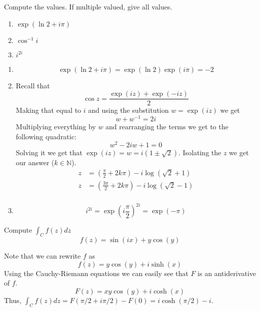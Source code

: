 \documentclass{article}
\def\N{\mathbb{N}}
\renewcommand{\exp}[1]{\operatorname{exp}\left(#1\right)}
\begin{document}
    \begin{tcolorbox}[title=Exercise 4]
        Compute the values. If multiple valued, give all values.
        \begin{enumerate}[label=(\alph*)]
            \item $\exp{\ln{2} + i\pi}$
            \item $\cos^{-1}{i}$
            \item $i^{2i}$
        \end{enumerate}
    \end{tcolorbox}
    \begin{enumerate}[label=(\alph*)]
        \item \begin{equation*}
            \exp{\ln{2} + i\pi} = \exp{\ln{2}}\exp{i\pi} = -2
        \end{equation*}
        \item Recall that
        \begin{equation*}
            \cos{z} = \frac{\exp{iz} + \exp{-iz}}{2}
        \end{equation*}
        Making that equal to $i$ and using the substitution $w = \exp{iz}$ we get
        \begin{equation*}
            w + w^{-1} = 2i
        \end{equation*}
        Multiplying everything by $w$ and rearranging the terms we get to the following quadratic:
        \begin{equation*}
            w^2 - 2iw + 1 = 0
        \end{equation*}
        Solving it we get that $\exp{iz} = w = i(1 \pm \sqrt{2})$. Isolating the $z$ we get our answer ($k \in \N$).
        \begin{align*}
            z &= \left(\frac{\pi}{2} + 2k\pi\right) -i\log(\sqrt{2} + 1) \\
            z &= \left(\frac{3\pi}{2} + 2k\pi\right) -i\log(\sqrt{2} - 1) \\
        \end{align*}
        \item \begin{equation*}
            i^{2i} = \exp{i \frac{\pi}{2}}^{2i} = \exp{-\pi}
        \end{equation*}
    \end{enumerate}

    \begin{tcolorbox}[title=Exercise 5]
        Compute $\int_C f(z) dz$
        \begin{equation*}
            f(z) = \sin(ix) + y\cos(y)
        \end{equation*}
    \end{tcolorbox}
    Note that we can rewrite $f$ as
    \begin{equation*}
        f(z) = y\cos(y) + i\sinh(x)
    \end{equation*}
    Using the Cauchy-Riemann equations we can easily see that $F$ is an antiderivative of $f$.
    \begin{equation*}
        F(z) = xy\cos(y) + i\cosh(x)
    \end{equation*}
    Thus, $\int_C f(z) dz = F(\pi/2 + i\pi/2) - F(0) = i\cosh(\pi/2) - i$.
\end{document}
